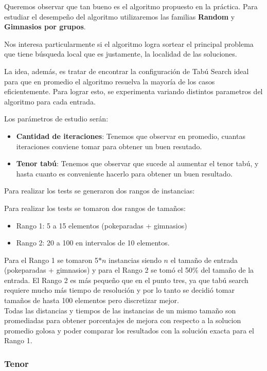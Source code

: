 Queremos observar que tan bueno es el algoritmo propuesto en la práctica.
Para estudiar el desempeño del algoritmo utilizaremos las familias \textbf{Random} y \textbf{Gimnasios por grupos}. 

Nos interesa particularmente si el algoritmo logra sortear el principal problema que tiene búsqueda local que es justamente, la localidad de las soluciones.

La idea, además, es tratar de encontrar la configuración de Tabú Search ideal para que en promedio el algoritmo resuelva la mayoría de los casos eficientemente. Para lograr esto, se experimenta variando distintos parametros del algoritmo para cada entrada.

Los parámetros de estudio serán:

\begin{itemize}
\item  \textbf{Cantidad de iteraciones}: Tenemos que observar en promedio, cuantas iteraciones conviene tomar para obtener un buen resutado.
\item \textbf{Tenor tabú}: Tenemos que observar que sucede al aumentar el tenor tabú, y hasta cuanto es conveniente hacerlo para obtener un buen resultado.
\end{itemize}

Para realizar los tests se generaron dos rangos de instancias:

Para realizar los tests se tomaron dos rangos de tamaños:
\begin{itemize}
\item Rango 1: 5 a 15 elementos (pokeparadas + gimnasios)
\item Rango 2: 20 a 100 en intervalos de 10 elementos.
\end{itemize}

Para el Rango 1 se tomaron 5$\ast n$ instancias siendo $n$ el tamaño de entrada (pokeparadas + gimnasios) y para el Rango 2 se tomó el 50\% del tamaño de la entrada. El Rango 2 es más pequeño que en el punto tres, ya que tabú search requiere mucho más tiempo de resolución y por lo tanto se decidió tomar tamaños de hasta 100 elementos pero discretizar mejor.\\

Todas las distancias y tiempos de las instancias de un mismo tamaño son promediadas para obtener porcentajes de mejora con respecto a la solucion promedio golosa y poder comparar los resultados con la solución exacta para el Rango 1.\\

\subsubsection*{Tenor}

